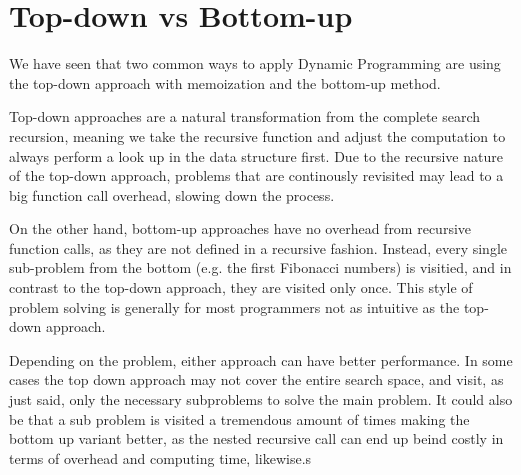 \section{Top-down vs Bottom-up}

We have seen that two common ways to apply Dynamic Programming are using the top-down approach with memoization
and the bottom-up method. 

Top-down approaches are a natural transformation from the complete search recursion, meaning we take the recursive function
and adjust the computation to always perform a look up in the data structure first. Due to the recursive nature of the
top-down approach, problems that are continously revisited may lead to a big function call overhead, slowing down the 
process. 

On the other hand, bottom-up approaches have no overhead from recursive function calls, as they are not defined
in a recursive fashion. Instead, every single sub-problem from the bottom (e.g. the first Fibonacci numbers) is visitied, and 
in contrast to the top-down approach, they are visited only once. This style of problem solving is generally for most programmers
not as intuitive as the top-down approach.

Depending on the problem, either approach can have better performance. In some cases the top down approach may not cover the entire search space,
and visit, as just said, only the necessary subproblems to solve the main problem. It could also be that a sub problem is visited a tremendous amount of times
making the bottom up variant better, as the nested recursive call can end up beind costly in terms of overhead and computing time, likewise.s

